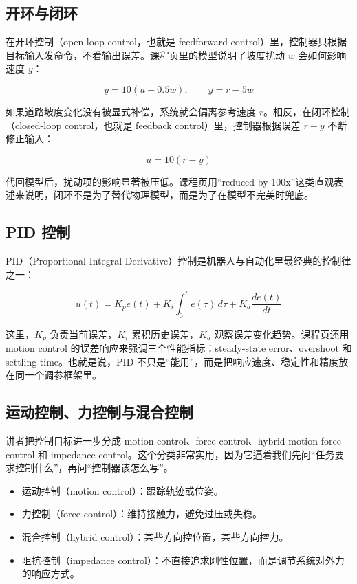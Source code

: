 \documentclass[a4paper]{article}
\begin{document}
\subsection{开环与闭环}
在开环控制（open-loop control，也就是 feedforward control）里，控制器只根据目标输入发命令，不看输出误差。课程页里的模型说明了坡度扰动 \(w\) 会如何影响速度 \(y\)：

\[
y = 10(u - 0.5w), \qquad y = r - 5w
\]

如果道路坡度变化没有被显式补偿，系统就会偏离参考速度 \(r\)。相反，在闭环控制（closed-loop control，也就是 feedback control）里，控制器根据误差 \(r-y\) 不断修正输入：

\[
u = 10(r-y)
\]

代回模型后，扰动项的影响显著被压低。课程页用“reduced by 100x”这类直观表述来说明，闭环不是为了替代物理模型，而是为了在模型不完美时兜底。

\subsection{PID 控制}
PID（Proportional-Integral-Derivative）控制是机器人与自动化里最经典的控制律之一：

\[
u(t) = K_p e(t) + K_i \int_0^t e(\tau)\,d\tau + K_d \frac{de(t)}{dt}
\]

这里，\(K_p\) 负责当前误差，\(K_i\) 累积历史误差，\(K_d\) 观察误差变化趋势。课程页还用 motion control 的误差响应来强调三个性能指标：steady-state error、overshoot 和 settling time。也就是说，PID 不只是“能用”，而是把响应速度、稳定性和精度放在同一个调参框架里。

\subsection{运动控制、力控制与混合控制}
讲者把控制目标进一步分成 motion control、force control、hybrid motion-force control 和 impedance control。这个分类非常实用，因为它逼着我们先问“任务要求控制什么”，再问“控制器该怎么写”。

\begin{itemize}
  \item 运动控制（motion control）：跟踪轨迹或位姿。
  \item 力控制（force control）：维持接触力，避免过压或失稳。
  \item 混合控制（hybrid control）：某些方向控位置，某些方向控力。
  \item 阻抗控制（impedance control）：不直接追求刚性位置，而是调节系统对外力的响应方式。
\end{itemize}
\end{document}
